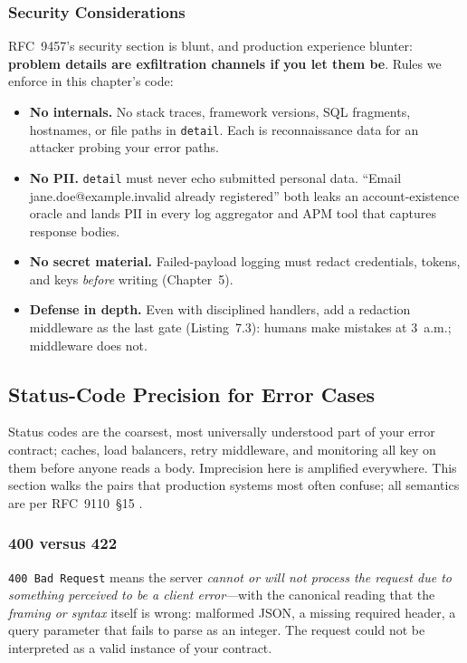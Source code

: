 \subsubsection{Security Considerations}

RFC~9457's security section is blunt, and production experience blunter:
\textbf{problem details are exfiltration channels if you let them be}.
Rules we enforce in this chapter's code:

\begin{itemize}
  \item \textbf{No internals.} No stack traces, framework versions, SQL
        fragments, hostnames, or file paths in \texttt{detail}. Each is
        reconnaissance data for an attacker probing your error paths.
  \item \textbf{No PII.} \texttt{detail} must never echo submitted personal
        data. ``Email jane.doe@example.invalid already registered'' both
        leaks an account-existence oracle and lands PII in every log
        aggregator and APM tool that captures response bodies.
  \item \textbf{No secret material.} Failed-payload logging must redact
        credentials, tokens, and keys \emph{before} writing (Chapter~5).
  \item \textbf{Defense in depth.} Even with disciplined handlers, add a
        redaction middleware as the last gate (Listing~7.3): humans make
        mistakes at 3~a.m.; middleware does not.
\end{itemize}

\subsection{Status-Code Precision for Error Cases}

Status codes are the coarsest, most universally understood part of your error
contract; caches, load balancers, retry middleware, and monitoring all key on
them before anyone reads a body. Imprecision here is amplified everywhere.
This section walks the pairs that production systems most often confuse; all
semantics are per RFC~9110~\S 15 \cite{rfc9110}.

\subsubsection{400 versus 422}

\texttt{400 Bad Request} means the server \emph{cannot or will not process
the request due to something perceived to be a client error}---with the
canonical reading that the \emph{framing or syntax} itself is wrong:
malformed JSON, a missing required header, a query parameter that fails to
parse as an integer. The request could not be interpreted as a valid
instance of your contract.

